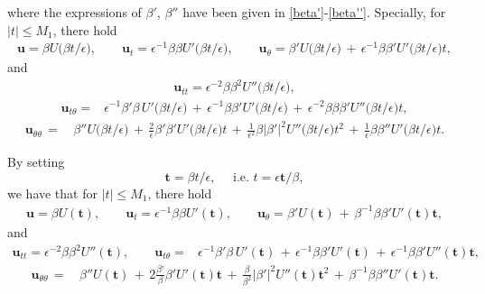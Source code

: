 \documentclass[10pt, reqno]{amsart}
\numberwithin{equation}{section}
\theoremstyle{definition}
\begin{document}
{{%
 where the expressions of $\beta'$, $\beta''$ have been given in \eqref{beta'}-\eqref{beta''}.
 Specially, for $|t|\leq M_1$, there hold
\begin{align}
 {\mathbf u} = \beta U\big(\beta t/\epsilon\big),
 \qquad
 {\mathbf u}_t = \epsilon^{-1}\beta\beta U'\big(\beta t/\epsilon\big),
 \qquad
  {\mathbf u}_{\theta} = \beta' U\big(\beta t/\epsilon\big)
 \,+\, \epsilon^{-1}\beta \beta' U'\big(\beta t/\epsilon\big)t,
 \label{mathbfu-t1}
\end{align}
 and
\begin{align}
 {\mathbf u}_{tt} =
 \epsilon^{-2}\beta\beta^2 U''\big(\beta t/\epsilon\big),
 \label{mathbfu-tt1}
\end{align}
\begin{align}
 {\mathbf u}_{t\theta} =&\epsilon^{-1}\beta'\beta\, U'\big(\beta t/\epsilon\big)
 \,+\,\epsilon^{-1}\beta \beta' U'\big(\beta t/\epsilon\big)
 \,+\,\epsilon^{-2}\beta\beta \beta' U''\big(\beta t/\epsilon\big)t,
 \label{mathbfu-ttheta1}
\end{align}
\begin{align}
 {\mathbf u}_{\theta\theta}
 \,=\, &\beta''U\big(\beta t/\epsilon\big)
 \,+\, \frac{2}{\epsilon}\beta'\beta' U'\big(\beta t/\epsilon\big)t
 \,+\, \frac{1}{\epsilon^2}\beta|\beta' |^2 U''\big(\beta t/\epsilon\big)t^2
 \,+\, \frac{1}{\epsilon}\beta\beta'' U'\big(\beta t/\epsilon\big)t.
 \label{mathbfu-thetatheta1}
\end{align}


\medskip
 By setting
$$
{\mathbf t}=\beta t/\epsilon,
 \quad\mbox{ i.e. }
 t=\epsilon {\mathbf t}/\beta,
$$
 we have that for $|t|\leq M_1$, there hold
\begin{align}\label{v1-t999}
 {\mathbf u} = \beta U({\mathbf t}),
 \qquad
 {\mathbf u}_t = \epsilon^{-1}\beta\beta U'({\mathbf t}),
  \qquad
   {\mathbf u}_{\theta} = \beta' U({\mathbf t})
 \,+\, \beta^{-1}\beta \beta' U'({\mathbf t}){\mathbf t},
\end{align}
 and
\begin{align}
 {\mathbf u}_{tt} =
 \epsilon^{-2}\beta\beta^2 U''({\mathbf t}),
   \qquad
 {\mathbf u}_{t\theta} =&\epsilon^{-1}\beta'\beta\, U'({\mathbf t})
 \,+\,\epsilon^{-1}\beta \beta' U'({\mathbf t})
 \,+\,\epsilon^{-1}\beta \beta' U''({\mathbf t}){\mathbf t},
 \label{v1-ttheta999}
\end{align}
\begin{align}
 {\mathbf u}_{\theta\theta}
 \,=\, &\beta''U({\mathbf t})
 \,+\, 2\frac{\beta'}{\beta}\beta' U'({\mathbf t}){\mathbf t}
 \,+\, \frac{\beta}{\beta^2} |\beta' |^2 U''({\mathbf t}){\mathbf t}^2
 \,+\, \beta^{-1}\beta\beta'' U'({\mathbf t}){\mathbf t}.
 \label{v1-thetatheta999}
\end{align}




}}
\end{document}
